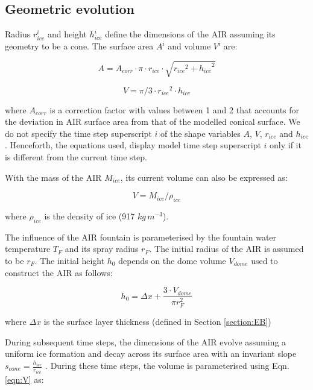 \documentclass[utf8]{frontiersSCNS} %
\begin{document}
\subsection{Geometric evolution}

Radius $r_{ice}^i$ and height $h_{ice}^i$ define the dimensions of the AIR assuming its geometry to be a cone. The
surface area $A^i$ and volume $V^i$ are:

\begin{equation} A = A_{corr} \cdot \pi \cdot r_{ice} \cdot \sqrt{{r_{ice}}^2 + {h_{ice}}^ 2} \label{eqn:A} \end{equation}

\begin{equation} V = \pi/3 \cdot {r_{ice}}^2 \cdot h_{ice} \label{eqn:V} \end{equation}

where $A_{corr}$ is a correction factor with values between 1 and 2 that accounts for the deviation in AIR surface area
from that of the modelled conical surface. We do not specify the time step superscript $i$ of the shape variables
$A$, $V$, $r_{ice}$ and $h_{ice}$. Henceforth, the equations used, display model time step superscript $i$ only if it is
different from the current time step.

With the mass of the AIR $M_{ice}$, its current volume can also be expressed as:

\begin{equation} V = M_{ice} /\rho_{ice} \label{eqn:V1} \end{equation}

where $\rho_{ice}$ is the density of ice (917 $kg\, m^{-3}$).


The influence of the AIR fountain is parameterised by the fountain water temperature $T_{F}$ and its spray radius $r_F$.
The initial radius of the AIR is assumed to be $r_F$. The initial height $h_0$ depends on the dome volume $V_{dome}$
used to construct the AIR as follows:

\begin{equation}
	h_{0} =  \Delta x + \frac{3 \cdot V_{dome}}{\pi r_F^2 }
	\label{eqn:h0}
\end{equation}

where $\Delta x$ is the surface layer thickness (defined in Section \ref{section:EB})

During subsequent time steps, the dimensions of the AIR evolve assuming a uniform ice formation and decay across its
surface area with an invariant slope $s_{cone} = \frac{h_{ice}}{r_{ice}}$ .  During these time steps, the volume is
parameterised using Eqn. \ref{eqn:V} as:
\end{document}
